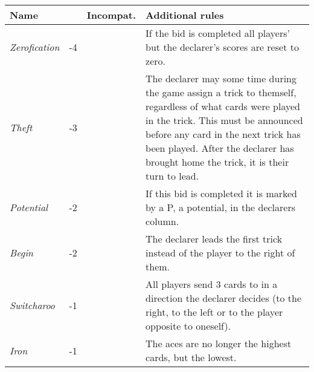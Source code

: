 %
%
%

\begin{table}
	\begin{center}
		\footnotesize {
			\begin{tabularx}{\textwidth}{ lcX | p{6cm} }
					\textbf{Name} & \rotccw{\textbf{Worth}} & \textbf{Incompat.} & \textbf{Additional rules}
					\\ \hline
					
					\textit{Zerofication} & -4 &
					&
					If the bid is completed all players' but the declarer's scores are reset to zero.
					\\ \hline
					
					\textit{Theft} & -3 &
					&
					The declarer may some time during the game assign a trick to themself, regardless of what cards were played in the trick. This must be announced before any card in the next trick has been played. After the declarer has brought home the trick, it is their turn to lead.
					\\ \hline
					
					\textit{Potential} & -2 &
					&
					If this bid is completed it is marked by a P, a potential, in the declarers column.
					\\ \hline
					
					\textit{Begin} & -2 &
					&
					The declarer leads the first trick instead of the player to the right of them.
					\\ \hline
					
					\textit{Switcharoo} & -1 &
					&
					All players send 3 cards to in a direction the declarer decides (to the right, to the left or to the player opposite to oneself).
					\\ \hline
					
					\textit{Iron} & -1 &
					&
					The aces are no longer the highest cards, but the lowest.
					\\ \hline
					

\end{tabularx}}
\end{center}
\end{table}
